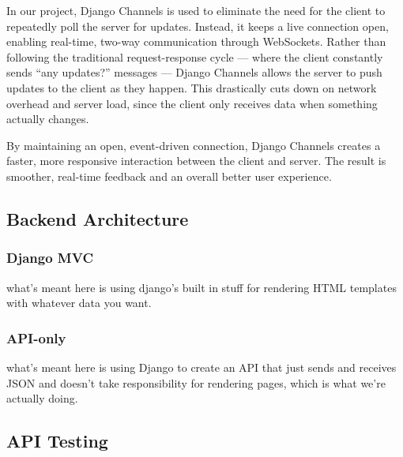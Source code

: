\documentclass[12pt]{article}
\begin{document}
In our project, Django Channels is used to eliminate the need for the client to repeatedly poll the server for updates.
Instead, it keeps a live connection open, enabling real-time, two-way communication through WebSockets.
Rather than following the traditional request-response cycle — where the client constantly sends “any updates?” messages —
Django Channels allows the server to push updates to the client as they happen.
This drastically cuts down on network overhead and server load, since the client only receives data when something actually changes.

By maintaining an open, event-driven connection, Django Channels creates a faster,
more responsive interaction between the client and server.
The result is smoother, real-time feedback and an overall better user experience.

\subsection{Backend Architecture}

\subsubsection{Django MVC}
what's meant here is using django's built in stuff for rendering HTML templates with whatever data you want.

\subsubsection{API-only}
what's meant here is using Django to create an API that just sends and receives JSON and doesn't take responsibility for rendering pages, which is what we're actually doing.


\subsection{API Testing}
\end{document}
